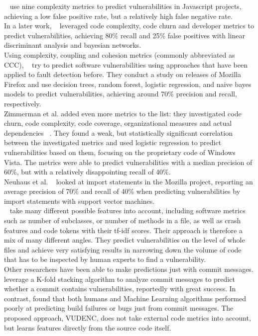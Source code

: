 \documentclass[
a4paper,
pagesize,
pdftex,
12pt,
twoside, %
BCOR=5mm, %
ngerman,
fleqn,
final,
]{scrartcl}
\begin{document}
	~\cite{Shin.2008} use nine complexity metrics to predict vulnerabilities in Javascript projects, achieving a low false positive rate, but a relatively high false negative rate.\\
	In a later work, ~\cite{Shin.2010} leveraged code complexity, code churn and developer metrics to predict vulnerabilities, achieving 80\% recall and 25\% false positives with linear discriminant analysis and bayesian networks. \\
	Using complexity, coupling and cohesion metrics (commonly abbreviated as CCC), ~\cite{Chowdhury.2011} try to predict software vulnerabilities using approaches that have been applied to fault detection before. They conduct a study on releases of Mozilla Firefox and use decision trees, random forest, logistic regression, and naive bayes models to predict vulnerabilities, achieving around 70\% precision and recall, respectively. \\
	Zimmerman et al. added even more metrics to the list: they investigated code churn, code complexity, code coverage, organizational measures and actual dependencies ~\cite{Zimmermann.2010}. They found a weak, but statistically significant correlation between the investigated metrics and used logistic regression to predict vulnerabilities based on them, focusing on the proprietary code of Windows Vista. The metrics were able to predict vulnerabilities with a median precision of 60\%, but with a relatively disappointing recall of 40\%. \\
	Neuhaus et al. ~\cite{Neuhaus.2007} looked at import statements in the Mozilla project, reporting an average precision of 70\% and recall of 40\% when predicting vulnerabilities by import statements with support vector machines. \\
	~\cite{Yu.2019} take many different possible features into account, including software metrics such as number of subclasses, or number of methods in a file, as well as crash features and code tokens with their tf-idf scores. Their approach is therefore a mix of many different angles. They predict vulnerabilities on the level of whole files and achieve very satisfying results in narrowing down the volume of code that has to be inspected by human experts to find a vulnerability.\\
	Other researchers have been able to make predictions just with commit messages. \cite{Zhou.2017} leverage a K-fold stacking algorithm to analyze commit messages to predict whether a commit contains vulnerabilities, reportedly with great success. In contrast, \cite{Russell.2018} found that both humans and Machine Learning algorithms performed poorly at predicting build failures or bugs just from commit messages.
	The proposed approach, VUDENC, does not take external code metrics into account, but learns features directly from the source code itself. 
	
\end{document}
